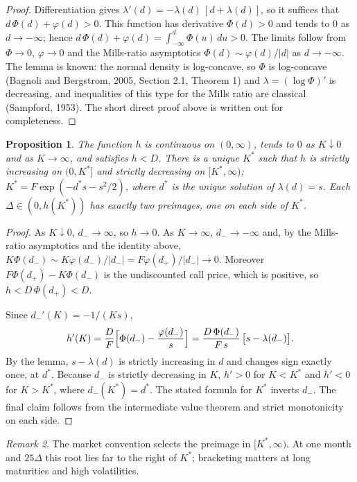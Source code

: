 \documentclass[11pt]{article}
\newtheorem{proposition}{Proposition}
\theoremstyle{remark}
\newtheorem{remark}[proposition]{Remark}
\begin{document}
\begin{proof}
Differentiation gives $\lambda'(d)=-\lambda(d)\,[d+\lambda(d)]$, so it suffices that $d\,\Phi(d)+\varphi(d)>0$. This function has derivative $\Phi(d)>0$ and tends to $0$ as $d\to-\infty$; hence $d\,\Phi(d)+\varphi(d)=\int_{-\infty}^d\Phi(u)\,du>0$. The limits follow from $\Phi\to0$, $\varphi\to0$ and the Mills-ratio asymptotics $\Phi(d)\sim\varphi(d)/|d|$ as $d\to-\infty$. The lemma is known: the normal density is log-concave, so $\Phi$ is log-concave (Bagnoli and Bergstrom, 2005, Section 2.1, Theorem 1) and $\lambda=(\log\Phi)'$ is decreasing, and inequalities of this type for the Mills ratio are classical (Sampford, 1953). The short direct proof above is written out for completeness.
\end{proof}

\begin{proposition}
The function $h$ is continuous on $(0,\infty)$, tends to $0$ as $K\downarrow0$ and as $K\to\infty$, and satisfies $h<D$. There is a unique $K^*$ such that $h$ is strictly increasing on $(0,K^*]$ and strictly decreasing on $[K^*,\infty)$; $K^*=F\exp(-d^*s-s^2/2)$, where $d^*$ is the unique solution of $\lambda(d)=s$. Each $\Delta\in(0,h(K^*))$ has exactly two preimages, one on each side of $K^*$.
\end{proposition}

\begin{proof}
As $K\downarrow0$, $d_-\to\infty$, so $h\to0$. As $K\to\infty$, $d_-\to-\infty$ and, by the Mills-ratio asymptotics and the identity above, $K\Phi(d_-)\sim K\varphi(d_-)/|d_-|=F\varphi(d_+)/|d_-|\to0$. Moreover $F\Phi(d_+)-K\Phi(d_-)$ is the undiscounted call price, which is positive, so $h<D\,\Phi(d_+)<D$.

Since $d_-'(K)=-1/(Ks)$,
\[
h'(K)=\frac{D}{F}\Bigl[\Phi(d_-)-\frac{\varphi(d_-)}{s}\Bigr]=\frac{D\,\Phi(d_-)}{F\,s}\,\bigl[s-\lambda(d_-)\bigr].
\]
By the lemma, $s-\lambda(d)$ is strictly increasing in $d$ and changes sign exactly once, at $d^*$. Because $d_-$ is strictly decreasing in $K$, $h'>0$ for $K<K^*$ and $h'<0$ for $K>K^*$, where $d_-(K^*)=d^*$. The stated formula for $K^*$ inverts $d_-$. The final claim follows from the intermediate value theorem and strict monotonicity on each side.
\end{proof}

\begin{remark}
The market convention selects the preimage in $[K^*,\infty)$. At one month and $25\Delta$ this root lies far to the right of $K^*$; bracketing matters at long maturities and high volatilities.
\end{remark}
\end{document}
